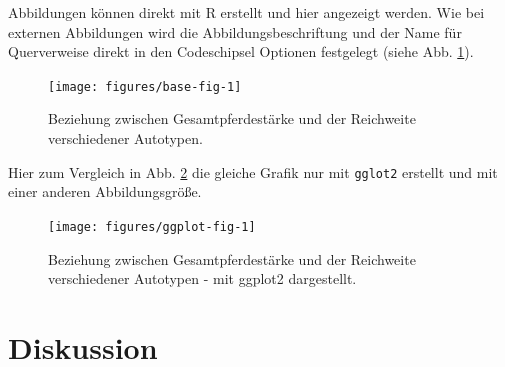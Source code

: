 \documentclass[a4paper,12pt]{article}
\begin{document}
Abbildungen können direkt mit R erstellt und hier angezeigt werden. Wie bei externen Abbildungen wird die Abbildungsbeschriftung und der Name für Querverweise direkt in den Codeschipsel Optionen festgelegt (siehe Abb. \ref{fig:base-fig}).
\begin{figure}

{\centering \texttt{[image: figures/base-fig-1]} 

}

\caption{Beziehung zwischen Gesamtpferdestärke und der Reichweite verschiedener Autotypen.}\label{fig:base-fig}
\end{figure}
Hier zum Vergleich in Abb. \ref{fig:ggplot-fig} die gleiche Grafik nur mit \texttt{gglot2} erstellt und mit einer anderen Abbildungsgröße.
\begin{figure}

{\centering \texttt{[image: figures/ggplot-fig-1]} 

}

\caption{Beziehung zwischen Gesamtpferdestärke und der Reichweite verschiedener Autotypen - mit ggplot2 dargestellt.}\label{fig:ggplot-fig}
\end{figure}
\hypertarget{diskussion}{%
\section{Diskussion}\label{diskussion}}
\end{document}
